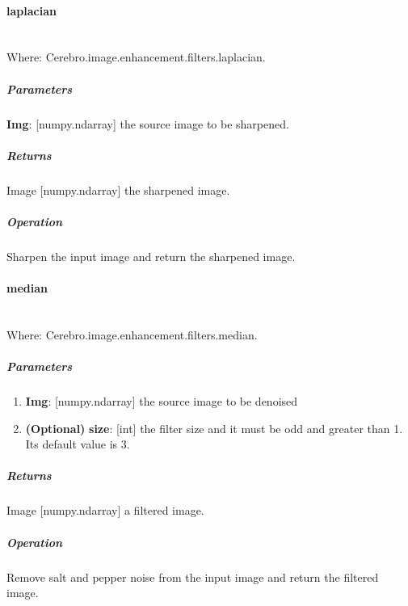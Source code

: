 \paragraph{laplacian} \mbox{} \\
Where: Cerebro.image.enhancement.filters.laplacian.
\subparagraph{Parameters}
\begin{changemargin}{1cm}{0cm}
	\textbf{Img}: [numpy.ndarray] the source image to be sharpened.
\end{changemargin}

\subparagraph{Returns}
\begin{changemargin}{1cm}{0cm}
	Image [numpy.ndarray] the sharpened image.
\end{changemargin}

\subparagraph{Operation}
\begin{changemargin}{1cm}{0cm}
	Sharpen the input image and return the sharpened image.
\end{changemargin}

\hrulefill

\paragraph{median} \mbox{} \\
Where: Cerebro.image.enhancement.filters.median.
\subparagraph{Parameters}
\begin{changemargin}{0.5cm}{0cm}
	\begin{enumerate}
		\item \textbf{Img}: [numpy.ndarray] the source image to be denoised
		\item \textbf{(Optional)} \textbf{size}: [int] the filter size and it must be odd and greater than 1. Its default value is 3.
	\end{enumerate}
\end{changemargin}

\subparagraph{Returns}
\begin{changemargin}{1cm}{0cm}
	Image [numpy.ndarray] a filtered image.
\end{changemargin}

\subparagraph{Operation}
\begin{changemargin}{1cm}{0cm}
 	Remove salt and pepper noise from the input image and return the filtered image.
\end{changemargin}

 	
